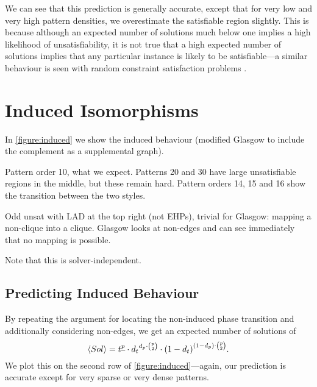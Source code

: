 \documentclass[letterpaper]{article}
\begin{document}
We can see that this prediction is generally accurate, except that for very low and very high
pattern densities, we overestimate the satisfiable region slightly. This is because although an
expected number of solutions much below one implies a high likelihood of unsatisfiability, it is not
true that a high expected number of solutions implies that any particular instance is likely to be
satisfiable---a similar behaviour is seen with random constraint satisfaction problems
\citep{Smith:1994,Smith:1996}.

\section{Induced Isomorphisms}

\begin{figure*}[tb]
    
    \caption{Behaviour of algorithms on the induced variant, shown in the style
    of \cref{figure:non-induced}. The second row shows a bound on the satisfiable region, by
    considering where a \emph{non-}induced isomorphism may also be a non-induced isomorphism between
    complement graphs.}\label{figure:induced}
\end{figure*}

In \cref{figure:induced} we show the induced behaviour (modified Glasgow to include the complement
as a supplemental graph).

Pattern order 10, what we expect. Patterns 20 and 30 have large unsatisfiable regions in the middle,
but these remain hard. Pattern orders 14, 15 and 16 show the transition between the two styles.

Odd unsat with LAD at the top right (not EHPs), trivial for Glasgow: mapping a non-clique into a
clique. Glasgow looks at non-edges and can see immediately that no mapping is possible.

Note that this is solver-independent.

\subsection{Predicting Induced Behaviour}

By repeating the argument for locating the non-induced phase transition and additionally considering
non-edges, we get an expected number of solutions of \[ \langle Sol \rangle = t^{\underline{p}}
    \cdot {d_t}^{d_p \cdot \binom{p}{2}} \cdot {(1 - d_{t})}^{(1 - d_{p}) \cdot \binom{p}{2}}
\textnormal{.} \] We plot this
on the second row of \cref{figure:induced}---again, our prediction is accurate except for very
sparse or very dense patterns.
\end{document}
